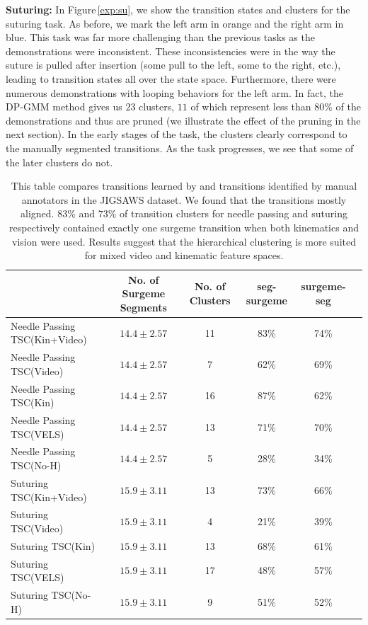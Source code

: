 \vspace{0.5em}

\noindent\textbf{Suturing: }
In Figure\,\ref{exp:su}, we show the transition states and clusters for the suturing task.
As before, we mark the left arm in orange and the right arm in blue.
This task was far more challenging than the previous tasks as the demonstrations were inconsistent.
These inconsistencies were in the way the suture is pulled after insertion (some pull to the left, some to the right, etc.), leading to transition states all over the state space. 
Furthermore, there were numerous demonstrations with looping behaviors for the left arm.
In fact, the DP-GMM method gives us $23$ clusters, $11$ of which represent less than $80$\% of the demonstrations and thus are pruned (we illustrate the effect of the pruning in the next section).
In the early stages of the task, the clusters clearly correspond to the manually segmented transitions.
As the task progresses, we see that some of the later clusters do not.



\begin{table}
\caption{This table compares transitions learned by \tsc and transitions identified by manual annotators in the JIGSAWS dataset. We found that the transitions mostly aligned. $83\%$ and $73\%$ of transition clusters for needle passing and suturing respectively contained exactly one surgeme transition when both kinematics and vision were used. Results suggest that the hierarchical clustering is more suited for mixed video and kinematic feature spaces.}
\centering
\scriptsize
\begin{tabular}{| l | c | c | c | c | c |}
\hline
 & No. of Surgeme Segments & No. of Clusters & seg-surgeme & surgeme-seg \\ 
\hline
Needle Passing TSC(Kin+Video)  & $14.4 \pm 2.57$ & 11 & 83\% & 74\% \\ \hline
Needle Passing TSC(Video) & $14.4 \pm 2.57$ & 7 & 62\% & 69\% \\ \hline
Needle Passing TSC(Kin) & $14.4 \pm 2.57$ & 16 & 87\% & 62\% \\ \hline
Needle Passing TSC(VELS) & $14.4 \pm 2.57$ & 13 & 71\% & 70\% \\ \hline
Needle Passing TSC(No-H)  & $14.4 \pm 2.57$ & 5 & 28\% & 34\% \\\hline
\hline
Suturing TSC(Kin+Video) & $15.9 \pm 3.11$ & 13 & 73\% & 66\% \\ \hline
Suturing TSC(Video) & $15.9 \pm 3.11$ & 4 & 21\% & 39\% \\ \hline
Suturing TSC(Kin) & $15.9 \pm 3.11$ & 13 & 68\% & 61\% \\ \hline
Suturing TSC(VELS) & $15.9 \pm 3.11$ & 17 & 48\% & 57\% \\ \hline
Suturing TSC(No-H) & $15.9 \pm 3.11$ & 9 & 51\% & 52\% \\ \hline
\end{tabular}
 \label{exp:surgemes}
\end{table}



